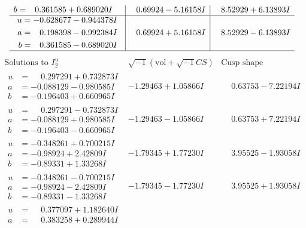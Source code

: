 \documentclass[1p]{elsarticle_modified}
\theoremstyle{definition}
\newcommand{\I}{\sqrt{-1}}
\begin{document}
$$\begin{array}{c|c|c}
\begin{aligned}
b &= \phantom{-}0.361585 + 0.689020 I\end{aligned}
 & \phantom{-}0.69924 - 5.16158 I & \phantom{-}8.52929 + 6.13893 I \\ \hline\begin{aligned}
u &= -0.628677 - 0.944378 I \\
a &= \phantom{-}0.198398 - 0.992384 I \\
b &= \phantom{-}0.361585 - 0.689020 I\end{aligned}
 & \phantom{-}0.69924 + 5.16158 I & \phantom{-}8.52929 - 6.13893 I\\
 \hline 
 \end{array}$$\newpage$$\begin{array}{c|c|c}  
\text{Solutions to }I^u_{2}& \I (\text{vol} + \sqrt{-1}CS) & \text{Cusp shape}\\
 \hline 
\begin{aligned}
u &= \phantom{-}0.297291 + 0.732873 I \\
a &= -0.088129 - 0.980585 I \\
b &= -0.196403 + 0.660965 I\end{aligned}
 & -1.29463 + 1.05866 I & \phantom{-}0.63753 - 7.22194 I \\ \hline\begin{aligned}
u &= \phantom{-}0.297291 - 0.732873 I \\
a &= -0.088129 + 0.980585 I \\
b &= -0.196403 - 0.660965 I\end{aligned}
 & -1.29463 - 1.05866 I & \phantom{-}0.63753 + 7.22194 I \\ \hline\begin{aligned}
u &= -0.348261 + 0.700215 I \\
a &= -0.98924 + 2.42809 I \\
b &= -0.89331 + 1.33268 I\end{aligned}
 & -1.79345 + 1.77230 I & \phantom{-}3.95525 - 1.93058 I \\ \hline\begin{aligned}
u &= -0.348261 - 0.700215 I \\
a &= -0.98924 - 2.42809 I \\
b &= -0.89331 - 1.33268 I\end{aligned}
 & -1.79345 - 1.77230 I & \phantom{-}3.95525 + 1.93058 I \\ \hline\begin{aligned}
u &= \phantom{-}0.377097 + 1.182640 I \\
a &= \phantom{-}0.383258 + 0.289944 I \\

\end{aligned}
\end{array}$$
\end{document}
